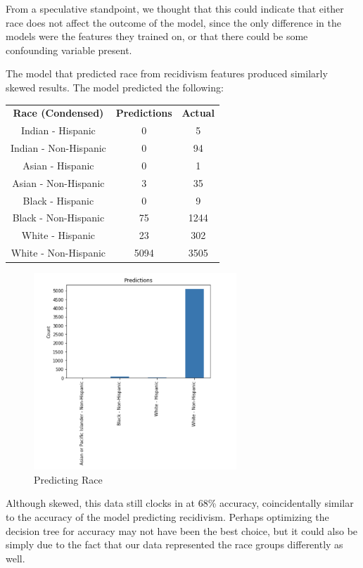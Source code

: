 \documentclass[11pt, sigconf]{acmart}
\begin{document}
From a speculative standpoint, we thought that this could indicate that either race does not affect the outcome of the model, since the only difference in the models were the features they trained on, or that there could be some confounding variable present. 

The model that predicted race from recidivism features produced similarly skewed results. The model predicted the following:

\begin{tabular}{|c|c|c|}
\textbf{Race (Condensed)} & \textbf{Predictions} & \textbf{Actual} \\
 Indian  - Hispanic& 0 & 5 \\
Indian - Non-Hispanic& 0 & 94 \\
 Asian - Hispanic& 0 & 1\\
 Asian  - Non-Hispanic& 3 & 35\\
 Black - Hispanic&0 & 9 \\
 Black - Non-Hispanic& 75 &1244\\ 
 White - Hispanic& 23& 302 \\
 White - Non-Hispanic &5094&3505\\
\end{tabular}

\begin{figure}[h] 	
\centering
\includegraphics[width=3in]{4.png}
\caption{Predicting Race}
\end{figure}

Although skewed, this data still clocks in at 68\% accuracy, coincidentally similar to the accuracy of the model predicting recidivism. Perhaps optimizing the decision tree for accuracy may not have been the best choice, but it could also be simply due to the fact that our data represented the race groups differently as well. 
\end{document}
